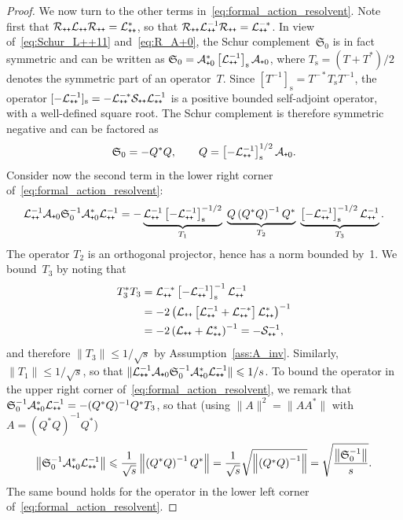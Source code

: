 \documentclass[10pt]{amsart}
\theoremstyle{definition}\newtheorem{defi}[theo]{Definition}\newtheorem{rema}[theo]{Remark}\newtheorem{exam}[theo]{Example}\newtheorem{exem}[theo]{Example}\newtheorem{nota}[theo]{Notation}
\newcommand{\rms}{\mathrm{s}}
\newcommand{\cL}{\mathcal{L}}
\newcommand{\cLs}{\mathcal{S}}
\newcommand{\cLa}{\mathcal{A}}
\newcommand{\cR}{\mathcal{R}}
\newcommand{\Schur}{\mathfrak{S}_0}
\newcommand{\subplus}{\textnormal{\texttt{+}}}
\renewcommand{\le}{\leqslant}
\begin{document}
\begin{proof}
We now turn to the other terms in~\eqref{eq:formal_action_resolvent}. Note first that $\cR_{\subplus\subplus} \cL_{\subplus\subplus}
\cR_{\subplus\subplus} = \cL_{\subplus\subplus}^*$, so that $\cR_{\subplus\subplus} \cL_{\subplus\subplus}^{-1}
\cR_{\subplus\subplus} = \cL_{\subplus\subplus}^{-*}$. In view of~\eqref{eq:Schur_L++11} and~\eqref{eq:R_A+0}, the Schur complement~$\Schur$ is in fact symmetric and can be written as $\Schur = \cLa_{\subplus0}^{*} \left[\cL_{\subplus\subplus}^{-1}\right]_{\rms} \cLa_{\subplus0}$, where $T_{{\rms}} = (T + T^{*})/2$ denotes the symmetric part of an operator~$T$. Since $[T^{-1}]_{{\rms}} = T^{-*} T_{{\rms}} T^{-1}$, the operator $[-\cL_{\subplus\subplus}^{-1}]_{\rms} = -\cL_{\subplus\subplus}^{-*}
\cLs_{\subplus\subplus}\cL_{\subplus\subplus}^{-1}$ is a positive bounded self-adjoint operator, with a well-defined square root. The Schur complement is therefore symmetric negative and can be factored as
\[
\Schur = -Q^{*} Q, \qquad Q = \left[-\cL_{\subplus\subplus}^{-1}\right]_{{\rms}}^{1/2} \cLa_{\subplus0}.
\]
Consider now the second term in the lower right corner of~\eqref{eq:formal_action_resolvent}:
\[
\cL_{\subplus\subplus}^{-1} \cLa_{\subplus0} \Schur^{-1} \cLa_{\subplus0}^{*} \cL_{\subplus\subplus}^{-1} = -\underbrace{\cL_{\subplus\subplus}^{-1}\left[-\cL_{\subplus\subplus}^{-1}\right]_{\rms}^{-1/2}}_{T_{1}} \; \underbrace{Q \left(Q^{*}Q\right)^{-1} Q^{*}}_{T_{2}}\; \underbrace{\left[-\cL_{\subplus\subplus}^{-1}\right]_{\rms}^{-1/2}\cL_{\subplus\subplus}^{-1}}_{T_{3}}.
\]
The operator $T_{2}$ is an orthogonal projector, hence has a norm bounded by~1. We bound~$T_{3}$ by noting that
\begin{align*}
T_{3}^{*} T_{3} &= \cL_{\subplus\subplus}^{-*} \left[-\cL_{\subplus\subplus}^{-1}\right]_{\rms}^{-1} \cL_{\subplus\subplus}^{-1}\\
 &= -2\left(\cL_{\subplus\subplus}\left[\cL_{\subplus\subplus}^{-1}+\cL_{\subplus\subplus}^{-*}\right]\cL_{\subplus\subplus}^*\right)^{-1} \\
&= -2\left(\cL_{\subplus\subplus}+\cL_{\subplus\subplus}^*\right)^{-1} = -\cLs_{\subplus\subplus}^{-1},
\end{align*}
and therefore $\|T_{3}\| \le 1/{\sqrt s}$ by Assumption~\ref{ass:A_inv}. Similarly, $\|T_{1}\| \le 1/{\sqrt s}$, so that $\|\cL_{\subplus\subplus}^{-1} \cLa_{\subplus0} \Schur^{-1} \cLa_{\subplus0}^{*} \cL_{\subplus\subplus}^{-1}\| \le 1/s$. To bound the operator in the upper right corner of~\eqref{eq:formal_action_resolvent}, we remark that $\Schur^{-1} \cLa_{\subplus0}^{*} \cL_{\subplus\subplus}^{-1} = -(Q^{*}Q)^{-1} Q^* T_3$, so that (using $\|A\|^2 = \|A A^*\|$ with $A=(Q^{*}Q)^{-1} Q^{*}$)
\[
\left\|\Schur^{-1} \cLa_{\subplus0}^{*} \cL_{\subplus\subplus}^{-1}\right\| \le \frac 1 {\sqrt s} \left\|\left(Q^{*}Q\right)^{-1} Q^*\right\| = \frac 1 {\sqrt s} \sqrt{\left\|\left(Q^{*}Q\right)^{-1}\right\|} = \sqrt{\frac{\left\|\Schur^{-1}\right\|}{s}}.
\]
The same bound holds for the operator in the lower left corner of~\eqref{eq:formal_action_resolvent}.


\end{proof}
\end{document}

